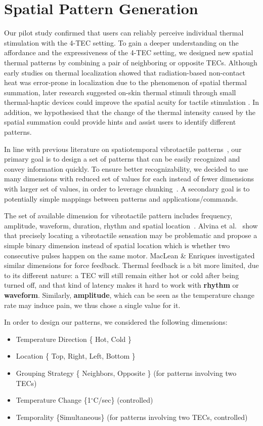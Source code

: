 \documentclass[preprint,12pt]{elsarticle}
\begin{document}
\section{Spatial Pattern Generation}
Our pilot study confirmed that users can reliably perceive individual thermal stimulation with the 4-TEC setting. To gain a deeper understanding on the affordance and the expressiveness of the 4-TEC setting, we designed new spatial thermal patterns by combining a pair of neighboring or opposite TECs.
Although early studies \cite{26,27,31} on thermal localization showed that radiation-based non-contact heat was error-prone in localization due to the phenomenon of spatial thermal summation, later research suggested on-skin thermal stimuli through small thermal-haptic devices could improve the spatial acuity for tactile stimulation \cite{28}.
In addition, we hypothesised that the change of the thermal intensity caused by the spatial summation could provide hints and assist users to identify different patterns.

In line with previous literature on spatiotemporal vibrotactile patterns~\cite{Alvina2015,Semfeel}, our primary goal is to design a set of patterns that can be easily recognized and convey information quickly. To ensure better recognizability, we decided to use many dimensions with reduced set of values for each instead of fewer dimensions with larger set of values, in order to leverage chunking~\cite{Miller1956}.
A secondary goal is to potentially simple mappings between patterns and applications/commands.

The set of available dimension for vibrotactile pattern includes frequency, amplitude, waveform, duration, rhythm and spatial location~\cite{Brown2005,Chan2008,MacLean2008}. Alvina et al.~\cite{Alvina2015} show that precisely locating a vibrotactile sensation may be problematic and propose a simple binary dimension instead of spatial location which is whether two consecutive pulses happen on the same motor.
MacLean \& Enriques investigated similar dimensions for force feedback.
Thermal feedback is a bit more limited, due to its different nature: a TEC will still remain either hot or cold after being turned off, and that kind of latency makes it hard to work with \textbf{rhythm} or \textbf{waveform}.
Similarly, \textbf{amplitude}, which can be seen as the temperature change rate may induce pain, we thus chose a single value for it.

In order to design our patterns, we considered the following dimensions:
\begin{itemize}
\item Temperature Direction \{ Hot, Cold \}
\item Location \{ Top, Right, Left, Bottom \}
\item Grouping Strategy \{ Neighbors, Opposite \} (for patterns involving two TECs)
\item Temperature Change \{1$^\circ$C/sec\} (controlled)
\item Temporality \{Simultaneous\} (for patterns involving two TECs, controlled)
\end{itemize}
\end{document}
